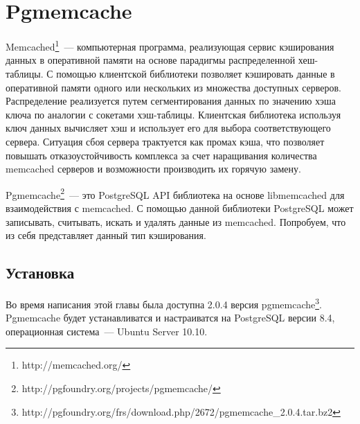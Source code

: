 \section{Pgmemcache}
Memcached\footnote{http://memcached.org/}~--- 
компьютерная программа, реализующая сервис кэширования данных в оперативной памяти на основе 
парадигмы распределенной хеш-таблицы. С помощью клиентской библиотеки позволяет кэшировать данные в оперативной 
памяти одного или нескольких из множества доступных серверов. Распределение реализуется путем сегментирования 
данных по значению хэша ключа по аналогии с сокетами хэш-таблицы. Клиентская библиотека используя ключ данных 
вычисляет хэш и использует его для выбора соответствующего сервера. Ситуация сбоя сервера трактуется как промах 
кэша, что позволяет повышать отказоустойчивость комплекса за счет наращивания количества memcached серверов и возможности 
производить их горячую замену.

Pgmemcache\footnote{http://pgfoundry.org/projects/pgmemcache/}~--- это 
PostgreSQL API библиотека на основе libmemcached для взаимодействия с memcached. С помощью данной библиотеки 
PostgreSQL может записывать, считывать, искать и удалять данные из memcached. Попробуем, что из себя представляет данный тип кэширования.


\subsection{Установка}
Во время написания этой главы была доступна 2.0.4 версия 
pgmemcache\footnote{http://pgfoundry.org/frs/download.php/2672/pgmemcache\_2.0.4.tar.bz2}. 
Pgmemcache будет устанавливатся и настраиватся на PostgreSQL версии 8.4, операционная система~--- Ubuntu Server 10.10.

